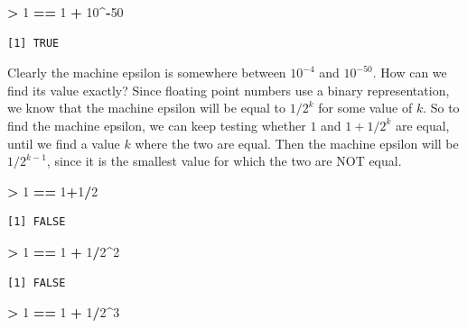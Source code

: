 \documentclass[]{krantz}
\makeatletter
\newenvironment{Shaded}{\begin{snugshade}}{\end{snugshade}}
\newcommand{\DecValTok}[1]{\textcolor[rgb]{0.06,0.06,0.06}{#1}}
\newcommand{\StringTok}[1]{\textcolor[rgb]{0.5,0.5,0.5}{#1}}
\newcommand{\OperatorTok}[1]{\textcolor[rgb]{0.43,0.43,0.43}{\textbf{#1}}}
\newenvironment{kframe}{%
\medskip{}
\setlength{\fboxsep}{.8em}
 \def\at@end@of@kframe{}%
 \ifinner\ifhmode%
  \def\at@end@of@kframe{\end{minipage}}%
  \begin{minipage}{\columnwidth}%
 \fi\fi%
 \def\FrameCommand##1{\hskip\@totalleftmargin \hskip-\fboxsep
 \colorbox{shadecolor}{##1}\hskip-\fboxsep
     \hskip-\linewidth \hskip-\@totalleftmargin \hskip\columnwidth}%
 \MakeFramed {\advance\hsize-\width
   \@totalleftmargin\z@ \linewidth\hsize
   \@setminipage}}%
 {\par\unskip\endMakeFramed%
 \at@end@of@kframe}
\renewenvironment{Shaded}{\begin{kframe}}{\end{kframe}}
\makeatother
\begin{document}
\begin{Shaded}
\begin{Highlighting}[]
\OperatorTok{>}\StringTok{ }\DecValTok{1} \OperatorTok{==}\StringTok{ }\DecValTok{1} \OperatorTok{+}\StringTok{ }\DecValTok{10}\OperatorTok{^-}\DecValTok{50}
\end{Highlighting}
\end{Shaded}

\begin{verbatim}
[1] TRUE
\end{verbatim}

Clearly the machine epsilon is somewhere between \(10^{-4}\) and
\(10^{-50}\). How can we find its value exactly? Since floating point
numbers use a binary representation, we know that the machine epsilon
will be equal to \(1/2^k\) for some value of \(k\). So to find the
machine epsilon, we can keep testing whether \(1\) and \(1+1/2^k\) are
equal, until we find a value \(k\) where the two are equal. Then the
machine epsilon will be \(1/2^{k-1}\), since it is the smallest value
for which the two are NOT equal.

\begin{Shaded}
\begin{Highlighting}[]
\OperatorTok{>}\StringTok{ }\DecValTok{1} \OperatorTok{==}\StringTok{ }\DecValTok{1}\OperatorTok{+}\DecValTok{1}\OperatorTok{/}\DecValTok{2}
\end{Highlighting}
\end{Shaded}

\begin{verbatim}
[1] FALSE
\end{verbatim}

\begin{Shaded}
\begin{Highlighting}[]
\OperatorTok{>}\StringTok{ }\DecValTok{1} \OperatorTok{==}\StringTok{ }\DecValTok{1} \OperatorTok{+}\StringTok{ }\DecValTok{1}\OperatorTok{/}\DecValTok{2}\OperatorTok{^}\DecValTok{2}
\end{Highlighting}
\end{Shaded}

\begin{verbatim}
[1] FALSE
\end{verbatim}

\begin{Shaded}
\begin{Highlighting}[]
\OperatorTok{>}\StringTok{ }\DecValTok{1} \OperatorTok{==}\StringTok{ }\DecValTok{1} \OperatorTok{+}\StringTok{ }\DecValTok{1}\OperatorTok{/}\DecValTok{2}\OperatorTok{^}\DecValTok{3}
\end{Highlighting}
\end{Shaded}
\end{document}
